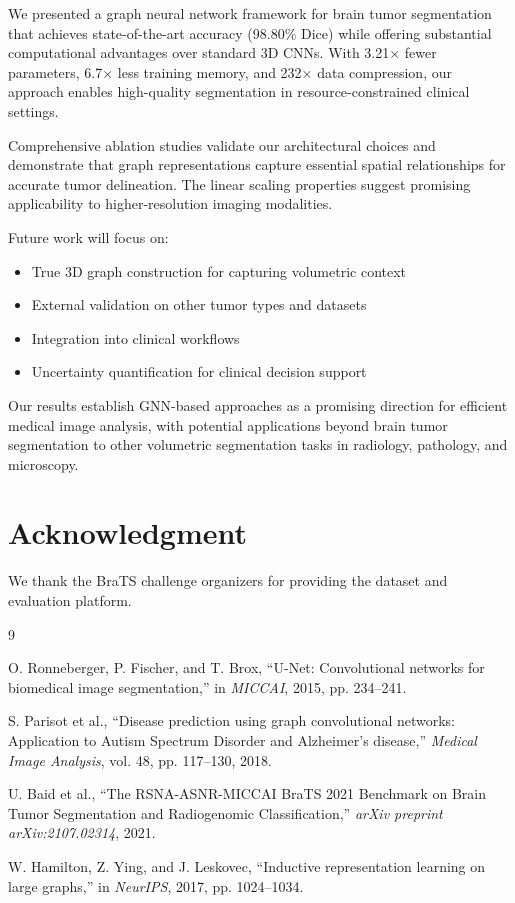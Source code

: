 \documentclass[conference]{IEEEtran}
\begin{document}
We presented a graph neural network framework for brain tumor segmentation that achieves state-of-the-art accuracy (98.80\% Dice) while offering substantial computational advantages over standard 3D CNNs. With 3.21× fewer parameters, 6.7× less training memory, and 232× data compression, our approach enables high-quality segmentation in resource-constrained clinical settings.

Comprehensive ablation studies validate our architectural choices and demonstrate that graph representations capture essential spatial relationships for accurate tumor delineation. The linear scaling properties suggest promising applicability to higher-resolution imaging modalities.

Future work will focus on:
\begin{itemize}
\item True 3D graph construction for capturing volumetric context
\item External validation on other tumor types and datasets
\item Integration into clinical workflows
\item Uncertainty quantification for clinical decision support
\end{itemize}

Our results establish GNN-based approaches as a promising direction for efficient medical image analysis, with potential applications beyond brain tumor segmentation to other volumetric segmentation tasks in radiology, pathology, and microscopy.

\section*{Acknowledgment}
We thank the BraTS challenge organizers for providing the dataset and evaluation platform.

\begin{thebibliography}{9}

O. Ronneberger, P. Fischer, and T. Brox,
``U-Net: Convolutional networks for biomedical image segmentation,''
in \textit{MICCAI}, 2015, pp. 234--241.

S. Parisot et al.,
``Disease prediction using graph convolutional networks: Application to Autism Spectrum Disorder and Alzheimer's disease,''
\textit{Medical Image Analysis}, vol. 48, pp. 117--130, 2018.

U. Baid et al.,
``The RSNA-ASNR-MICCAI BraTS 2021 Benchmark on Brain Tumor Segmentation and Radiogenomic Classification,''
\textit{arXiv preprint arXiv:2107.02314}, 2021.

W. Hamilton, Z. Ying, and J. Leskovec,
``Inductive representation learning on large graphs,''
in \textit{NeurIPS}, 2017, pp. 1024--1034.

\end{thebibliography}
\end{document}
